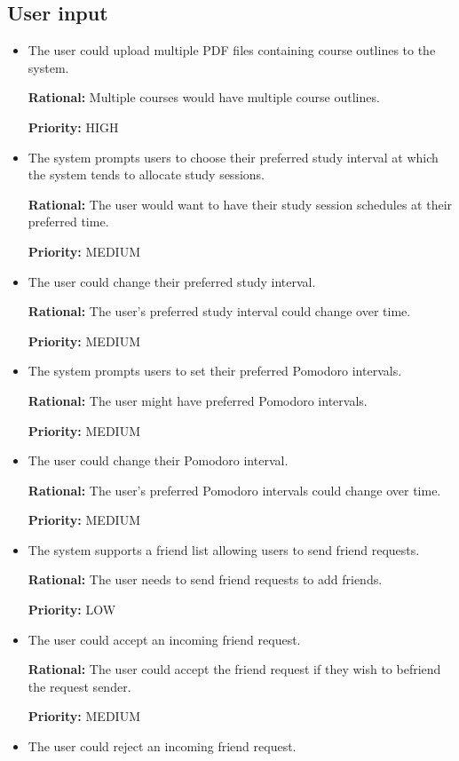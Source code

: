 \documentclass[12pt]{article}
\newcounter{reqnum} %
\newcommand{\rthereqnum}{FR\refstepcounter{reqnum}\thereqnum:}
\begin{document}
\subsection{User input}
\begin{itemize}
\item[\rthereqnum \label{R_upload_pdf}]
The user could upload multiple PDF files containing course outlines to the system.

\textbf{Rational:} Multiple courses would have multiple course outlines.

\textbf{Priority:} HIGH
\item[\rthereqnum]
The system prompts users to choose their preferred study interval at which the system tends to allocate study sessions.

\textbf{Rational:} The user would want to have their study session schedules at their preferred time.

\textbf{Priority:} MEDIUM
\item[\rthereqnum]
The user could change their preferred study interval.

\textbf{Rational:} The user's preferred study interval could change over time. 

\textbf{Priority:} MEDIUM
\item[\rthereqnum]
The system prompts users to set their preferred Pomodoro intervals. 

\textbf{Rational:} The user might have preferred Pomodoro intervals.

\textbf{Priority:} MEDIUM
\item[\rthereqnum]
The user could change their Pomodoro interval.

\textbf{Rational:} The user's preferred Pomodoro intervals could change over time.

\textbf{Priority:} MEDIUM
\item[\rthereqnum]
The system supports a friend list allowing users to send friend requests.

\textbf{Rational:} The user needs to send friend requests to add friends.

\textbf{Priority:} LOW
\item[\rthereqnum]
The user could accept an incoming friend request.

\textbf{Rational:} The user could accept the friend request if they wish to befriend the request sender.

\textbf{Priority:} MEDIUM
\item[\rthereqnum]
The user could reject an incoming friend request.


\end{itemize}
\end{document}
